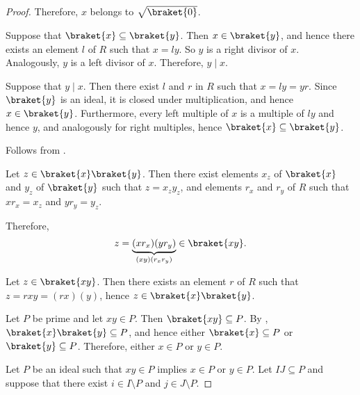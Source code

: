 \begin{proof}
  Therefore, \( x \) belongs to \( \sqrt{\braket{0}} \).


  \SufficiencySubProof* Suppose that \( \braket{x} \subseteq \braket{y} \). Then \( x \in \braket{y} \), and hence there exists an element \( l \) of \( R \) such that \( x = ly \). So \( y \) is a right divisor of \( x \). Analogously, \( y \) is a left divisor of \( x \). Therefore, \( y \mid x \).

  \NecessitySubProof* Suppose that \( y \mid x \). Then there exist \( l \) and \( r \) in \( R \) such that \( x = ly = yr \). Since \( \braket{ y } \) is an ideal, it is closed under multiplication, and hence \( x \in \braket{ y } \). Furthermore, every left multiple of \( x \) is a multiple of \( ly \) and hence \( y \), and analogously for right multiples, hence \( \braket{ x } \subseteq \braket{ y } \).

   Follows from .

  \hfill
  \SufficiencySubProof* Let \( z \in \braket{x} \braket{y} \). Then there exist elements \( x_z \) of \( \braket{x} \) and \( y_z \) of \( \braket{y} \) such that \( z = x_z y_z \), and elements \( r_x \) and \( r_y \) of \( R \) such that \( x r_x = x_z \) and \( y r_y = y_z \).

  Therefore,
  \begin{equation*}
    z = \underbrace{(x r_x) (y r_y)}_{(xy) (r_x r_y)} \in \braket{xy}.
  \end{equation*}

  \NecessitySubProof* Let \( z \in \braket{xy} \). Then there exists an element \( r \) of \( R \) such that \( z = rxy = (rx)(y) \), hence \( z \in \braket{x} \braket{y} \).

  \hfill
  \SufficiencySubProof* Let \( P \) be prime and let \( xy \in P \). Then \( \braket{xy} \subseteq P \). By , \( \braket{x} \braket{y} \subseteq P \), and hence either \( \braket{x} \subseteq P \) or \( \braket{y} \subseteq P \). Therefore, either \( x \in P \) or \( y \in P \).

  \NecessitySubProof* Let \( P \) be an ideal such that \( xy \in P \) implies \( x \in P \) or \( y \in P \). Let \( IJ \subseteq P \) and suppose that there exist \( i \in I \setminus P \) and \( j \in J \setminus P \).


\end{proof}
